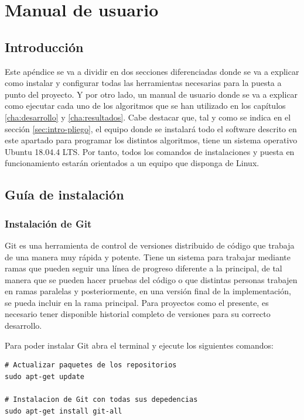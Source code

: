 
\chapter{Manual de usuario}
\label{cha:manual-usuario}

\section{Introducción}
\label{sec:intro-manual-de-usuario}

Este apéndice se va a dividir en dos secciones diferenciadas donde se va a explicar como instalar y configurar todas las herramientas necesarias para la puesta a punto del proyecto. Y por otro lado, un manual de usuario donde se va a explicar como ejecutar cada uno de los algoritmos que se han utilizado en los capítulos \ref{cha:desarrollo} y \ref{cha:resultados}.
Cabe destacar que, tal y como se indica en el sección \ref{sec:intro-pliego}, el equipo donde se instalará todo el software descrito en este apartado para programar los distintos algoritmos, tiene un sistema operativo Ubuntu 18.04.4 LTS. Por tanto, todos los comandos de instalaciones y puesta en funcionamiento estarán orientados a un equipo que disponga de Linux.

\section{Guía de instalación}
\label{sec:sec-guia-instalacion}

\subsection{Instalación de Git}
\label{subsec:instalacion-git}

Git es una herramienta de control de versiones distribuido de código que trabaja de una manera muy rápida y potente. Tiene un sistema para trabajar mediante ramas que pueden seguir una línea de progreso diferente a la principal, de tal manera que se pueden hacer pruebas del código o que distintas personas trabajen en ramas paralelas y posteriormente, en una versión final de la implementación, se pueda incluir en la rama principal. Para proyectos como el presente, es necesario tener disponible historial completo de versiones para su correcto desarrollo.

Para poder instalar Git abra el terminal y ejecute los siguientes comandos:

\vspace{0.5cm}
\begin{lstlisting}[language=iPython,caption=Instalación de Git,captionpos=b,label={lst:install-git}]
# Actualizar paquetes de los repositorios
sudo apt-get update

# Instalacion de Git con todas sus depedencias
sudo apt-get install git-all
\end{lstlisting}

